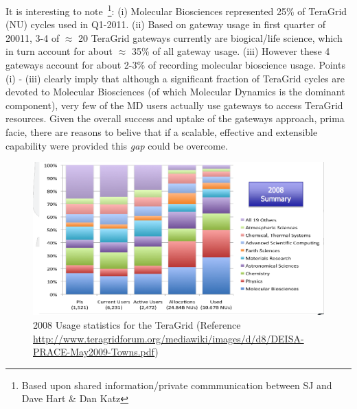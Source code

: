 \documentclass{sig-alternate}
\begin{document}

It is interesting to note~\footnote{Based upon shared
  information/private commmunication between SJ and Dave Hart \& Dan
  Katz}: (i) Molecular Biosciences represented 25\% of TeraGrid (NU)
cycles used in Q1-2011.  (ii) Based on gateway usage in first quarter
of 20011, 3-4 of $\approx$ 20 TeraGrid gateways currently are
biogical/life science, which in turn account for about $\approx$ 35\%
of all gateway usage. (iii) However these 4 gateways account for about
2-3\% of recording molecular bioscience usage. Points (i) - (iii)
clearly imply that although a significant fraction of TeraGrid cycles
are devoted to Molecular Biosciences (of which Molecular Dynamics is
the dominant component), very few of the MD users actually use
gateways to access TeraGrid resources.  Given the overall success and
uptake of the gateways approach, prima facie, there are reasons to
belive that if a scalable, effective and extensible capability were
provided this {\it gap} could be overcome.
 

\begin{figure}
 \centering
\includegraphics[scale=0.27]{figures/teragrid-discipline08}
\caption{\small 2008 Usage statistics for the TeraGrid (Reference
  \url{http://www.teragridforum.org/mediawiki/images/d/d8/DEISA-PRACE-May2009-Towns.pdf})}
  \label{tg2008}
\end{figure}
\end{document}
